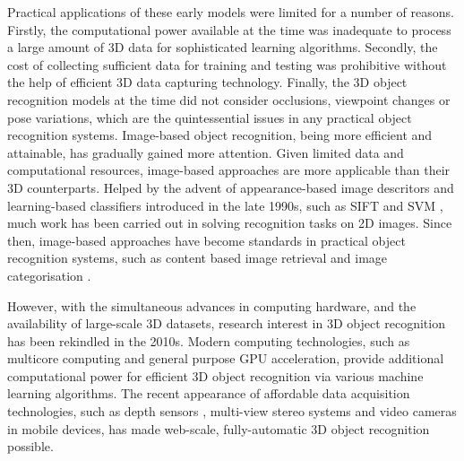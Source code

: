 Practical applications of these early models were limited for a number of reasons. Firstly, the computational power available at the time was inadequate to process a large amount of 3D data for sophisticated learning algorithms. 
Secondly, the cost of collecting sufficient data for training and testing was prohibitive without the help of efficient 3D data capturing technology. 
Finally, the 3D object recognition models at the time did not consider occlusions, viewpoint changes or pose variations, which are the quintessential issues in any practical object recognition systems. 
Image-based object recognition, being more efficient and attainable, has gradually gained more attention. Given limited data and computational resources, image-based approaches are more applicable than their 3D counterparts.
Helped by the advent of appearance-based image descritors and learning-based classifiers introduced in the late 1990s, such as SIFT \cite{Lowe2004} and SVM \cite{Chapelle1999}, much work has been carried out in solving recognition tasks on 2D images. Since then, image-based approaches have become standards in practical object recognition systems, such as content based image retrieval \cite{Datta2008} and image categorisation \cite{Galleguillos2010}. 

However, with the simultaneous advances in computing hardware, and the availability of large-scale 3D datasets, research interest in 3D object recognition has been rekindled in the 2010s.  
Modern computing technologies, such as multicore computing and general purpose GPU acceleration, provide additional computational power for efficient 3D object recognition via various machine learning algorithms. The recent appearance of affordable data acquisition technologies, such as depth sensors \cite{Shotton2011}, multi-view stereo systems \cite{Vogiatzis2011} and video cameras in mobile devices, has made web-scale, fully-automatic 3D object recognition possible.  

